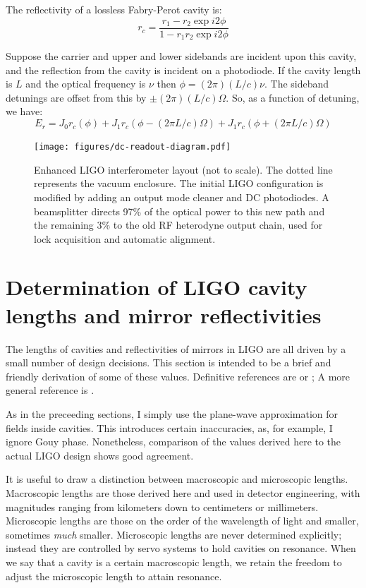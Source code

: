The reflectivity of a lossless Fabry-Perot cavity is:
\begin{equation}
r_c = \frac{r_1 - r_2 \exp i2\phi}{1 - r_1 r_2 \exp i 2\phi}
\end{equation}

Suppose the carrier and upper and lower sidebands are incident upon this
cavity, and the reflection from the cavity is incident on a photodiode.
If the cavity length is $L$ and the optical frequency is $\nu$ then
$\phi = (2\pi)(L/c)\nu$.  The sideband detunings are offset from this by
$\pm(2\pi)(L/c)\Omega$.  So, as a function of detuning, we have:
%
\begin{equation}
E_r = J_0 r_c(\phi) 
+ J_1 r_c(\phi - (2\pi L/c)\Omega) 
+ J_1 r_c(\phi + (2\pi L/c)\Omega)
\end{equation}


\begin{figure}
\texttt{[image: figures/dc-readout-diagram.pdf]}
\caption[Enhanced LIGO interferometer
  layout]{\label{fig:dc-readout-ifo}Enhanced LIGO interferometer
  layout (not to scale).  The dotted line represents the vacuum
  enclosure. The initial LIGO configuration is modified by adding an
  output mode cleaner and DC photodiodes.  A beamsplitter directs 97\%
  of the optical power to this new path and the remaining 3\% to the
  old RF heterodyne output chain, used for lock acquisition and
  automatic alignment.}
\end{figure}


\section{Determination of LIGO cavity lengths and mirror reflectivities}

The lengths of cavities and reflectivities of mirrors in LIGO are all
driven by a small number of design decisions.  This section is
intended to be a brief and friendly derivation of some of these
values.  Definitive references are \cite{LigoFreqResponse97} or
\cite{Fritschel2001Readout}; A more general reference is
\cite{S5InstrumentPaper}.

As in the preceeding sections, I simply use the plane-wave
approximation for fields inside cavities. This introduces certain
inaccuracies, as, for example, I ignore Gouy phase. Nonetheless,
comparison of the values derived here to the actual LIGO design shows good agreement.

It is useful to draw a distinction between macroscopic and microscopic
lengths. Macroscopic lengths are those derived here and
used in detector engineering, with magnitudes ranging from kilometers
down to centimeters or millimeters. Microscopic lengths are those
on the order of the wavelength of light and smaller, sometimes \emph{much}
smaller. Microscopic lengths are never determined explicitly; instead
they are controlled by servo systems to hold cavities on resonance.
When we say that a cavity is a certain macroscopic length, we retain
the freedom to adjust the microscopic length to attain resonance.

